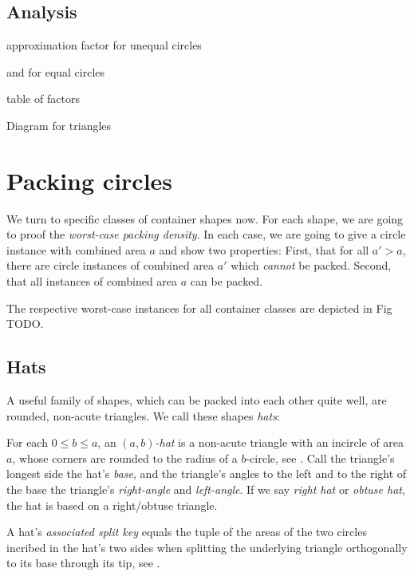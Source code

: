 \documentclass[a4paper,style=print,bibliography=totoc,nexus,lnum,extramargin]{tubsbook}
\begin{document}
\section{Analysis}

approximation factor for unequal circles

and for equal circles

table of factors

Diagram for triangles

\chapter{Packing circles}

We turn to specific classes of container shapes now. For each shape, we are going to proof the \emph{worst-case packing density}. In each case, we are going to give a circle instance with combined area $a$ and show two properties: First, that for all $a' > a$, there are circle instances of combined area $a'$ which \emph{cannot} be packed. Second, that all instances of combined area $a$ can be packed.

The respective worst-case instances for all container classes are depicted in Fig TODO.

\section{Hats}

A useful family of shapes, which can be packed into each other quite well, are rounded, non-acute triangles. We call these shapes \emph{hats}:

\begin{definition}
    For each $0 \le b \le a$, an \emph{$(a,b)$-hat} is a non-acute triangle with an incircle of area $a$, whose corners are rounded to the radius of a $b$-circle, see . Call the triangle's longest side the hat's \emph{base}, and the triangle's angles to the left and to the right of the base the triangle's \emph{right-angle} and \emph{left-angle}.
    If we say \emph{right hat} or \emph{obtuse hat}, the hat is based on a right/obtuse triangle.
\end{definition}

\newcommand\defaulta{30}
\newcommand\defaultb{40}
\newcommand\defaultr{0.2}
\newcommand\defaultx{0.6}


\begin{definition}\label{def:hat-split-key}
    A hat's \emph{associated split key} equals the tuple of the areas of the two circles incribed in the hat's two sides when splitting the underlying triangle orthogonally to its base through its tip, see .
\end{definition}
\end{document}

